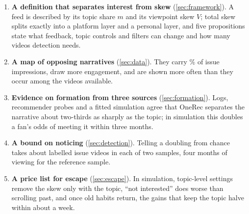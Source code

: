 \begin{enumerate}
  \item \textbf{A definition that separates interest from skew} (\cref{sec:framework}). A feed is described by its topic share $m$ and its viewpoint skew $V$; total skew splits exactly into a platform layer and a personal layer, and five propositions state what feedback, topic controls and filters can change and how many videos detection needs.
  \item \textbf{A map of opposing narratives} (\cref{sec:data}). They carry \nOppShare\% of issue impressions, draw more engagement, and are shown more often than they occur among the videos available.
  \item \textbf{Evidence on formation from three sources} (\cref{sec:formation}). Logs, recommender probes and a fitted simulation agree that OneRec separates the narrative about two-thirds as sharply as the topic; in simulation this doubles a fan's odds of meeting it within three months.
  \item \textbf{A bound on noticing} (\cref{sec:detection}). Telling a doubling from chance takes about \nDetNDouble{} labelled issue videos in each of two samples, four months of viewing for the reference sample.
  \item \textbf{A price list for escape} (\cref{sec:escape}). In simulation, topic-level settings remove the skew only with the topic, ``not interested'' does worse than scrolling past, and once old habits return, the gains that keep the topic halve within about a week.
\end{enumerate}
